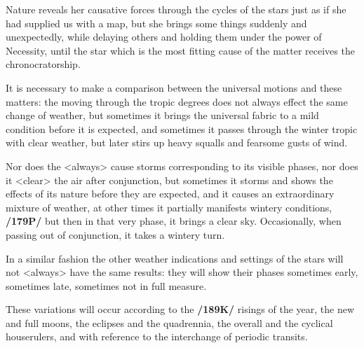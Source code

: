 Nature reveals her causative forces through the cycles of the stars just as if she had supplied us with a map, but she brings some things suddenly and unexpectedly, while delaying others and holding them under the power of Necessity, until the
star which is the most fitting cause of the matter receives the chronocratorship.

It is necessary to make a comparison between the universal motions and these matters: the \Sun\xspace moving through the tropic degrees does not always effect the same change of weather, but sometimes it brings the universal fabric to a mild condition before it is expected, and sometimes it passes through the winter tropic with clear weather, but later stirs up heavy squalls and fearsome gusts of wind. 

Nor does the \Moon <always> cause storms corresponding to its visible phases, nor does it <clear> the air after conjunction, but sometimes it storms and shows the effects of its nature before they are expected, and it causes an
extraordinary mixture of weather, at other times it partially manifests wintery conditions, \textbf{/179P/} but then
in that very phase, it brings a clear sky. Occasionally, when passing out of conjunction, it takes a wintery turn. 

In a similar fashion the other weather indications and settings of the stars will not <always> have the same results: they will show their phases sometimes early, sometimes late, sometimes not in full measure.

These variations will occur according to the \textbf{/189K/} risings of the year, the new and full moons, the eclipses and the quadrennia, the overall and the cyclical houserulers, and with reference to the interchange of periodic transits.

\newpage